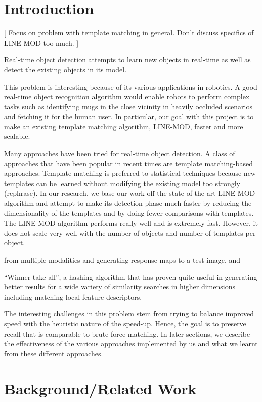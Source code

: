 \documentclass[10pt,twocolumn,letterpaper]{article}
\begin{document}
\section{Introduction}

[ Focus on problem with template matching in general. Don't discuss specifics of LINE-MOD too much.
]

Real-time object detection attempts to learn new objects in real-time as well as detect the existing objects in its model.

This problem is interesting because of its various applications in robotics. A good real-time object recognition algorithm would enable robots to perform complex tasks such as identifying mugs in the close vicinity in heavily occluded scenarios and fetching it for the human user. In particular, our goal with this project is to make an existing template matching algorithm, LINE-MOD, faster and more scalable.

Many approaches have been tried for real-time object detection. A class of approaches that have been popular in recent times are template matching-based approaches. Template matching is preferred to statistical techniques because new templates can be learned without modifying the existing model too strongly (rephrase). In our research, we base our work off the state of the art LINE-MOD algorithm and attempt to make its detection phase much faster by reducing the dimensionality of the templates and by doing fewer comparisons with templates. The LINE-MOD algorithm performs really well and is extremely fast. However, it does not scale very well with the number of objects and number of templates per object.

 from multiple modalities and generating response maps to a test image, and 

“Winner take all”, a hashing algorithm that has proven quite useful in generating better results for a wide variety of similarity searches in higher dimensions including matching local feature descriptors.

The interesting challenges in this problem stem from trying to balance improved speed with the heuristic nature of the speed-up. Hence, the goal is to preserve recall that is comparable to brute force matching. In later sections, we describe the effectiveness of the various approaches implemented by us and what we learnt from these different approaches.

\section{Background/Related Work}
\end{document}

